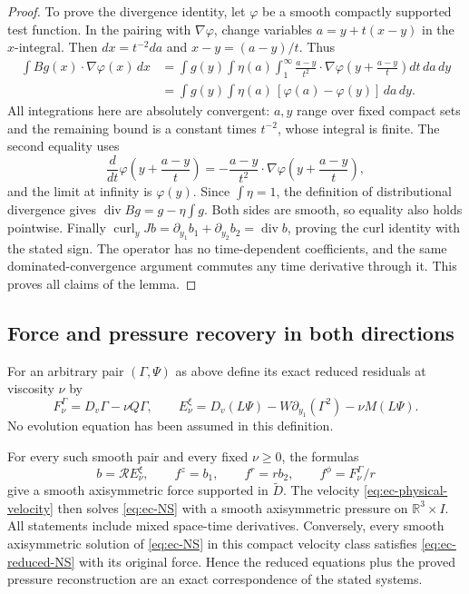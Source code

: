 \begin{proof}
To prove the divergence identity, let \(\varphi\) be a smooth compactly
supported test function.  In the pairing with \(\nabla\varphi\), change
variables \(a=y+t(x-y)\) in the \(x\)-integral.  Then
\(dx=t^{-2}da\) and \(x-y=(a-y)/t\).  Thus
\begin{align*}
 \int Bg(x)\cdot\nabla\varphi(x)\,dx
  &=\int g(y)\int\eta(a)\int_1^\infty
       \frac{a-y}{t^2}\cdot
        \nabla\varphi\left(y+\frac{a-y}{t}\right)dt\,da\,dy\\
  &=\int g(y)\int\eta(a)\,[\varphi(a)-\varphi(y)]\,da\,dy.
\end{align*}
All integrations here are absolutely convergent: \(a,y\) range over
fixed compact sets and the remaining bound is a constant times
\(t^{-2}\), whose integral is finite.  The second equality uses
\[
 \frac{d}{dt}\varphi\left(y+\frac{a-y}{t}\right)
 =-\frac{a-y}{t^2}\cdot\nabla\varphi\left(y+\frac{a-y}{t}\right),
\]
and the limit at infinity is \(\varphi(y)\).
Since \(\int\eta=1\), the definition of distributional divergence
gives \(\operatorname{div}Bg=g-\eta\int g\).
Both sides are smooth, so equality also holds pointwise.  Finally
\(\operatorname{curl}_y Jb
=\partial_{y_1}b_1+\partial_{y_2}b_2=\operatorname{div}b\),
proving the curl identity with the stated sign.  The operator has no
time-dependent coefficients, and the same dominated-convergence
argument commutes any time derivative through it.  This proves all
claims of the lemma.
\end{proof}

\subsection{Force and pressure recovery in both directions}

For an arbitrary pair \((\Gamma,\Psi)\) as above define its exact
reduced residuals at viscosity \(\nu\) by
\begin{equation}
 F_\nu^\Gamma=D_v\Gamma-\nu Q\Gamma,\qquad
 E_\nu^\xi=D_v(L\Psi)-W\partial_{y_1}(\Gamma^2)-\nu M(L\Psi).
 \label{eq:ec-residuals}
\end{equation}
No evolution equation has been assumed in this definition.

\begin{proposition}
\label{prop:ec-reconstruction}
For every such smooth pair and every fixed \(\nu\geq0\), the formulas
\begin{equation}
 b=\mathcal R E_\nu^\xi,\qquad
 f^z=b_1,\qquad f^r=rb_2,\qquad f^\phi=F_\nu^\Gamma/r
 \label{eq:ec-force-recovery}
\end{equation}
give a smooth axisymmetric force supported in \(\widetilde D\).
The velocity \eqref{eq:ec-physical-velocity} then solves
\eqref{eq:ec-NS} with a smooth axisymmetric pressure on
\(\mathbb R^3\times I\).  All statements include mixed space-time
derivatives.  Conversely, every smooth axisymmetric solution of
\eqref{eq:ec-NS} in this compact velocity class satisfies
\eqref{eq:ec-reduced-NS} with its original force.  Hence the reduced
equations plus the proved pressure reconstruction are an exact
correspondence of the stated systems.
\end{proposition}

